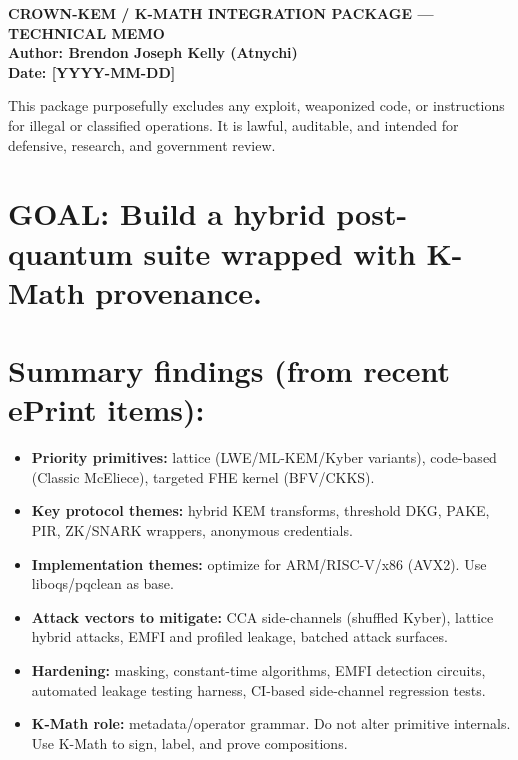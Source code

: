 \documentclass[11pt, a4paper]{article}
\begin{document}
\pagestyle{empty} %

\begin{center}
    \Large \textbf{CROWN-KEM / K-MATH INTEGRATION PACKAGE --- TECHNICAL MEMO} \\
    \large \textbf{Author: Brendon Joseph Kelly (Atnychi)} \\
    \large \textbf{Date: [YYYY-MM-DD]}
\end{center}

\vspace{0.5cm}

\begin{tcolorbox}[
    colback=gray!5!white,
    colframe=black,
    sharp corners,
    boxrule=1pt,
    title=\textbf{NOTICE},
    fonttitle=\bfseries
]
This package purposefully excludes any exploit, weaponized code,
or instructions for illegal or classified operations. It is lawful,
auditable, and intended for defensive, research, and government review.
\end{tcolorbox}

\section*{GOAL: Build a hybrid post-quantum suite wrapped with K-Math provenance.}

\section*{Summary findings (from recent ePrint items):}
\begin{itemize}
    \item \textbf{Priority primitives:} lattice (LWE/ML-KEM/Kyber variants), code-based (Classic McEliece), targeted FHE kernel (BFV/CKKS).
    \item \textbf{Key protocol themes:} hybrid KEM transforms, threshold DKG, PAKE, PIR, ZK/SNARK wrappers, anonymous credentials.
    \item \textbf{Implementation themes:} optimize for ARM/RISC-V/x86 (AVX2). Use liboqs/pqclean as base.
    \item \textbf{Attack vectors to mitigate:} CCA side-channels (shuffled Kyber), lattice hybrid attacks, EMFI and profiled leakage, batched attack surfaces.
    \item \textbf{Hardening:} masking, constant-time algorithms, EMFI detection circuits, automated leakage testing harness, CI-based side-channel regression tests.
    \item \textbf{K-Math role:} metadata/operator grammar. Do not alter primitive internals. Use K-Math to sign, label, and prove compositions.
\end{itemize}
\end{document}
